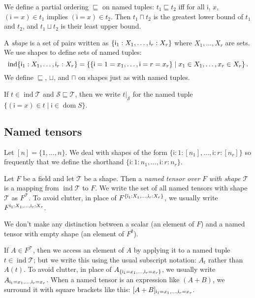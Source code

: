 \documentclass{article}
\newcommand{\name}[1]{\mathsf{#1}}
\newcommand{\nidx}[2]{\name{#1}=#2}
\newcommand{\nset}[2]{\name{#1}:#2}
\newcommand{\tuple}[1]{\{ #1\}}
\DeclareMathOperator{\tupledom}{dom}
\DeclareMathOperator{\tupleshape}{ind}
\newcommand{\tuplerestrict}[2]{\left.#1\right|_{#2}}
\begin{document}
We define a partial ordering $\sqsubseteq$ on named tuples: $t_1 \sqsubseteq t_2$ iff for all $\name{i}$, $x$, $(\nidx{i}{x}) \in t_1$ implies $(\nidx{i}{x}) \in t_2$. Then $t_1 \sqcap t_2$ is the greatest lower bound of $t_1$ and $t_2$, and $t_1 \sqcup t_2$ is their least upper bound.

A \emph{shape} is a set of pairs written as $\tuple{\nset{i\sub{1}}{X_1}, \ldots, \nset{i\sub{r}}{X_r}}$ where $X_1, \ldots, X_r$ are sets. We use shapes to define sets of named tuples:
\begin{equation*}
\tupleshape \tuple{\nset{i\sub{1}}{X_1}, \ldots, \nset{i\sub{r}}{X_r}} = \left\{\tuple{\nidx{i}{1}=x_1, \ldots, \nidx{i}{r}=x_r} \mid x_1 \in X_1, \ldots, x_r \in X_r\right\}.
\end{equation*}
We define $\sqsubseteq$, $\sqcup$, and $\sqcap$ on shapes just as with named tuples.

If $t \in \tupleshape \mathcal{T}$ and $\mathcal{S} \sqsubseteq \mathcal{T}$, then we write $\tuplerestrict{t}{\mathcal{S}}$ for the named tuple $\{(\nidx{i}{x}) \in t \mid \name{i} \in \tupledom{S}\}$.

\subsection{Named tensors}

Let $[n] = \{1, \ldots, n\}$. We deal with shapes of the form $\tuple{\nset{i}{1}: [n_1], \ldots, \nset{i}{r}: [n_r]}$ so frequently that we define the shorthand $\tuple{\nset{i}{1}: n_1, \ldots, \nset{i}{r}: n_r}$.

Let $F$ be a field and let $\mathcal{T}$ be a shape. Then a \emph{named tensor over $F$ with shape $\mathcal{T}$} is a mapping from $\tupleshape \mathcal{T}$ to $F$. We write the set of all named tensors with shape $\mathcal{T}$ as $F^{\mathcal{T}}$. To avoid clutter, in place of $F^{\tuple{\nset{i\sub{1}}{X_1}, \ldots, \nset{i\sub{r}}{X_r}}}$, we usually write $F^{\nset{i\sub{1}}{X_1}, \ldots, \nset{i\sub{r}}{X_r}}$.

We don't make any distinction between a scalar (an element of $F$) and a named tensor with empty shape (an element of $F^\emptyset$).

If $A \in F^{\mathcal{T}}$, then we access an element of $A$ by applying it to a named tuple $t \in \tupleshape\mathcal{T}$; but we write this using the usual subscript notation: $A_t$ rather than $A(t)$. To avoid clutter, in place of $A_{\tuple{\nidx{i\sub{1}}{x_1}, \ldots, \nidx{i\sub{r}}{x_r}}}$, we usually write $A_{\nidx{i\sub{1}}{x_1}, \ldots, \nidx{i\sub{r}}{x_r}}$. When a named tensor is an expression like $(A+B)$, we surround it with square brackets like this: $[A+B]_{\nidx{i\sub{1}}{x_1}, \ldots, \nidx{i\sub{r}}{x_r}}$.
\end{document}
